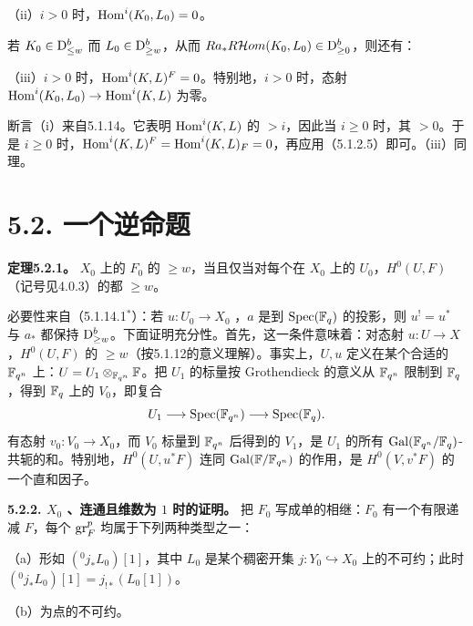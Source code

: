 （ii）$i>0$ 时，$\operatorname{Hom}^i(K_0,L_0)=0$。

若 $K_0\in\mathrm{D}_{\le w}^b$ 而 $L_0\in\mathrm{D}_{\ge w}^b$，从而 $Ra_*R\mathcal Hom(K_0,L_0)\in\mathrm{D}_{\ge0}^b$，则还有：

（iii）$i>0$ 时，$\operatorname{Hom}^i(K,L)^F=0$。特别地，$i>0$ 时，态射 $\operatorname{Hom}^i(K_0,L_0)\to\operatorname{Hom}^i(K,L)$ 为零。

断言（i）来自5.1.14。它表明 $\operatorname{Hom}^i(K,L)$ 的 $>i$，因此当 $i\ge0$ 时，其 $>0$。于是 $i\ge0$ 时，$\operatorname{Hom}^i(K,L)^F=\operatorname{Hom}^i(K,L)_F=0$，再应用（5.1.2.5）即可。（iii）同理。

\section*{5.2. 一个逆命题}
\par\medskip\noindent\textbf{定理5.2.1。} $X_0$ 上的 $F_0$ 的 $\ge w$，当且仅当对每个在 $X_0$ 上的 $U_0$，$H^0(U,F)$（记号见4.0.3）的都 $\ge w$。

必要性来自（5.1.14.1${}^*$）：若 $u:U_0\to X_0$ ，$a$ 是到 $\operatorname{Spec}(\mathbb F_q)$ 的投影，则 $u^!=u^*$ 与 $a_*$ 都保持 $\mathrm{D}_{\ge w}^b$。下面证明充分性。首先，这一条件意味着：对态射 $u:U\to X$，$H^0(U,F)$ 的 $\ge w$（按5.1.12的意义理解）。事实上，$U,u$ 定义在某个合适的 $\mathbb F_{q^n}$ 上：$U=U_1\otimes_{\mathbb F_{q^n}}\mathbb F$。把 $U_1$ 的标量按 Grothendieck 的意义从 $\mathbb F_{q^n}$ 限制到 $\mathbb F_q$，得到 $\mathbb F_q$ 上的 $V_0$，即复合
\[
U_1\longrightarrow\operatorname{Spec}(\mathbb F_{q^n})\longrightarrow\operatorname{Spec}(\mathbb F_q).
\]
有态射 $v_0:V_0\to X_0$，而 $V_0$ 标量到 $\mathbb F_{q^n}$ 后得到的 $V_1$，是 $U_1$ 的所有 $\operatorname{Gal}(\mathbb F_{q^n}/\mathbb F_q)$-共轭的和。特别地，$H^0(U,u^*F)$ 连同
$\operatorname{Gal}(\mathbb F/\mathbb F_{q^n})$ 的作用，是 $H^0(V,v^*F)$ 的一个直和因子。

\par\medskip\noindent\textbf{5.2.2. $X_0$ 、连通且维数为 $1$ 时的证明。}
把 $F_0$ 写成单的相继：$F_0$ 有一个有限递减 $F$，每个 $\operatorname{gr}_F^p$ 均属于下列两种类型之一：

（a）形如 $({}^0j_*L_0)[1]$，其中 $L_0$ 是某个稠密开集 $j:Y_0\hookrightarrow X_0$ 上的不可约；此时 $({}^0j_*L_0)[1]=j_{!*}(L_0[1])$。

（b）为点的不可约。

